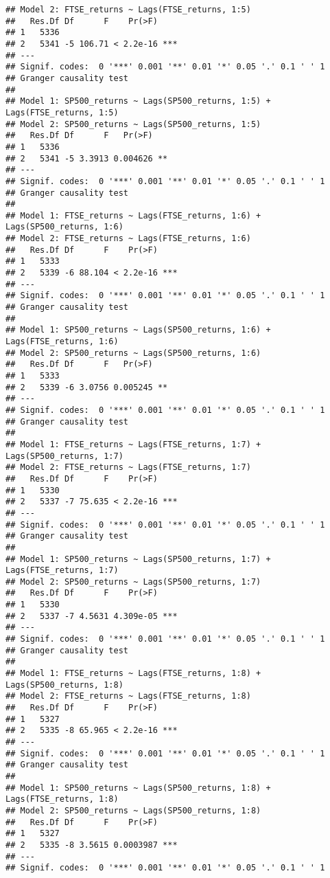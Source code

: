\documentclass[]{article}
\begin{document}
\begin{verbatim}
## Model 2: FTSE_returns ~ Lags(FTSE_returns, 1:5)
##   Res.Df Df      F    Pr(>F)    
## 1   5336                        
## 2   5341 -5 106.71 < 2.2e-16 ***
## ---
## Signif. codes:  0 '***' 0.001 '**' 0.01 '*' 0.05 '.' 0.1 ' ' 1
## Granger causality test
## 
## Model 1: SP500_returns ~ Lags(SP500_returns, 1:5) + Lags(FTSE_returns, 1:5)
## Model 2: SP500_returns ~ Lags(SP500_returns, 1:5)
##   Res.Df Df      F   Pr(>F)   
## 1   5336                      
## 2   5341 -5 3.3913 0.004626 **
## ---
## Signif. codes:  0 '***' 0.001 '**' 0.01 '*' 0.05 '.' 0.1 ' ' 1
## Granger causality test
## 
## Model 1: FTSE_returns ~ Lags(FTSE_returns, 1:6) + Lags(SP500_returns, 1:6)
## Model 2: FTSE_returns ~ Lags(FTSE_returns, 1:6)
##   Res.Df Df      F    Pr(>F)    
## 1   5333                        
## 2   5339 -6 88.104 < 2.2e-16 ***
## ---
## Signif. codes:  0 '***' 0.001 '**' 0.01 '*' 0.05 '.' 0.1 ' ' 1
## Granger causality test
## 
## Model 1: SP500_returns ~ Lags(SP500_returns, 1:6) + Lags(FTSE_returns, 1:6)
## Model 2: SP500_returns ~ Lags(SP500_returns, 1:6)
##   Res.Df Df      F   Pr(>F)   
## 1   5333                      
## 2   5339 -6 3.0756 0.005245 **
## ---
## Signif. codes:  0 '***' 0.001 '**' 0.01 '*' 0.05 '.' 0.1 ' ' 1
## Granger causality test
## 
## Model 1: FTSE_returns ~ Lags(FTSE_returns, 1:7) + Lags(SP500_returns, 1:7)
## Model 2: FTSE_returns ~ Lags(FTSE_returns, 1:7)
##   Res.Df Df      F    Pr(>F)    
## 1   5330                        
## 2   5337 -7 75.635 < 2.2e-16 ***
## ---
## Signif. codes:  0 '***' 0.001 '**' 0.01 '*' 0.05 '.' 0.1 ' ' 1
## Granger causality test
## 
## Model 1: SP500_returns ~ Lags(SP500_returns, 1:7) + Lags(FTSE_returns, 1:7)
## Model 2: SP500_returns ~ Lags(SP500_returns, 1:7)
##   Res.Df Df      F    Pr(>F)    
## 1   5330                        
## 2   5337 -7 4.5631 4.309e-05 ***
## ---
## Signif. codes:  0 '***' 0.001 '**' 0.01 '*' 0.05 '.' 0.1 ' ' 1
## Granger causality test
## 
## Model 1: FTSE_returns ~ Lags(FTSE_returns, 1:8) + Lags(SP500_returns, 1:8)
## Model 2: FTSE_returns ~ Lags(FTSE_returns, 1:8)
##   Res.Df Df      F    Pr(>F)    
## 1   5327                        
## 2   5335 -8 65.965 < 2.2e-16 ***
## ---
## Signif. codes:  0 '***' 0.001 '**' 0.01 '*' 0.05 '.' 0.1 ' ' 1
## Granger causality test
## 
## Model 1: SP500_returns ~ Lags(SP500_returns, 1:8) + Lags(FTSE_returns, 1:8)
## Model 2: SP500_returns ~ Lags(SP500_returns, 1:8)
##   Res.Df Df      F    Pr(>F)    
## 1   5327                        
## 2   5335 -8 3.5615 0.0003987 ***
## ---
## Signif. codes:  0 '***' 0.001 '**' 0.01 '*' 0.05 '.' 0.1 ' ' 1
\end{verbatim}
\end{document}
